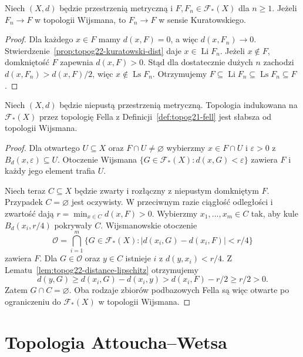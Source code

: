 \begin{twierdzenie}
\label{thm:topog22-wijsman-kuratowski}
Niech \((X,d)\) będzie przestrzenią metryczną
i \(F,F_n\in\mathcal F_*(X)\) dla \(n\ge1\).
Jeżeli \(F_n\to F\) w topologii Wijsmana,
to \(F_n\to F\) w sensie Kuratowskiego.
\end{twierdzenie}
\begin{proof}
Dla każdego \(x\in F\) mamy \(d(x,F)=0\),
a więc \(d(x,F_n)\to0\).
Stwierdzenie~\ref{prop:topog22-kuratowski-dist}
daje \(x\in\operatorname{Li}F_n\).
Jeżeli \(x\notin F\), domkniętość \(F\) zapewnia
\(d(x,F)>0\). Stąd dla dostatecznie dużych \(n\)
zachodzi \(d(x,F_n)>d(x,F)/2\), więc
\(x\notin\operatorname{Ls}F_n\).
Otrzymujemy
\(F\subseteq\operatorname{Li}F_n
\subseteq\operatorname{Ls}F_n\subseteq F\).
\end{proof}

\begin{stwierdzenie}
\label{prop:topog22-wijsman-fell}
Niech \((X,d)\) będzie niepustą przestrzenią metryczną.
Topologia indukowana na \(\mathcal F_*(X)\)
przez topologię Fella z Definicji~\ref{def:topog21-fell}
jest słabsza od topologii Wijsmana.
\end{stwierdzenie}
\begin{proof}
Dla otwartego \(U\subseteq X\) oraz \(F\cap U\neq\varnothing\)
wybierzmy \(x\in F\cap U\) i \(\varepsilon>0\)
z \(B_d(x,\varepsilon)\subseteq U\).
Otoczenie Wijsmana
\(\{G\in\mathcal F_*(X):d(x,G)<\varepsilon\}\)
zawiera \(F\) i każdy jego element trafia \(U\).

Niech teraz \(C\subseteq X\) będzie zwarty i rozłączny
z niepustym domkniętym \(F\).
Przypadek \(C=\varnothing\) jest oczywisty.
W przeciwnym razie ciągłość odległości i zwartość
dają \(r=\min_{x\in C}d(x,F)>0\).
Wybierzmy \(x_1,\ldots,x_m\in C\) tak,
aby kule \(B_d(x_i,r/4)\) pokrywały \(C\).
Wijsmanowskie otoczenie
\[
 \mathcal O=\bigcap_{i=1}^{m}
 \{G\in\mathcal F_*(X):
   |d(x_i,G)-d(x_i,F)|<r/4\}
\]
zawiera \(F\).
Dla \(G\in\mathcal O\) oraz \(y\in C\)
istnieje \(i\) z \(d(y,x_i)<r/4\).
Z Lematu~\ref{lem:topog22-distance-lipschitz}
otrzymujemy
\[
 d(y,G)\ge d(x_i,G)-d(x_i,y)
 > d(x_i,F)-r/2\ge r/2>0.
\]
Zatem \(G\cap C=\varnothing\).
Oba rodzaje zbiorów podbazowych Fella
są więc otwarte po ograniczeniu
do \(\mathcal F_*(X)\) w topologii Wijsmana.
\end{proof}

\section{Topologia Attoucha--Wetsa}
\label{sec:topog22-aw}

